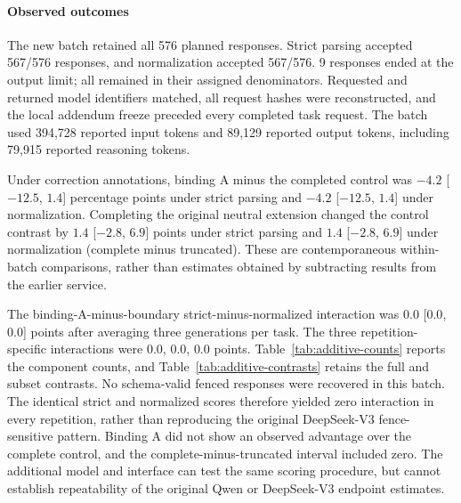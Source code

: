 \paragraph{Observed outcomes}
The new batch retained all 576 planned responses. Strict parsing accepted 567/576 responses, and normalization accepted 567/576. 9 responses ended at the output limit; all remained in their assigned denominators. Requested and returned model identifiers matched, all request hashes were reconstructed, and the local addendum freeze preceded every completed task request. The batch used 394,728 reported input tokens and 89,129 reported output tokens, including 79,915 reported reasoning tokens.

Under correction annotations, binding A minus the completed control was $-4.2$ [$-12.5$, $1.4$] percentage points under strict parsing and $-4.2$ [$-12.5$, $1.4$] under normalization. Completing the original neutral extension changed the control contrast by $1.4$ [$-2.8$, $6.9$] points under strict parsing and $1.4$ [$-2.8$, $6.9$] under normalization (complete minus truncated). These are contemporaneous within-batch comparisons, rather than estimates obtained by subtracting results from the earlier service.

The binding-A-minus-boundary strict-minus-normalized interaction was $0.0$ [$0.0$, $0.0$] points after averaging three generations per task. The three repetition-specific interactions were $0.0$, $0.0$, $0.0$ points. Table~\ref{tab:additive-counts} reports the component counts, and Table~\ref{tab:additive-contrasts} retains the full and subset contrasts. No schema-valid fenced responses were recovered in this batch. The identical strict and normalized scores therefore yielded zero interaction in every repetition, rather than reproducing the original DeepSeek-V3 fence-sensitive pattern. Binding A did not show an observed advantage over the complete control, and the complete-minus-truncated interval included zero. The additional model and interface can test the same scoring procedure, but cannot establish repeatability of the original Qwen or DeepSeek-V3 endpoint estimates.


